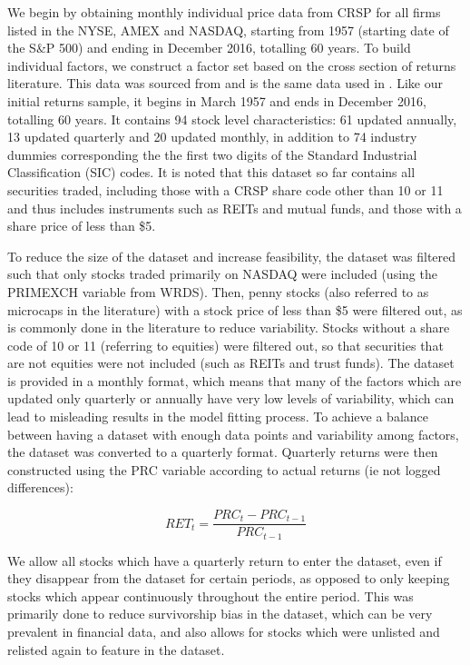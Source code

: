 \documentclass{article}
\begin{document}
We begin by obtaining monthly individual price data from CRSP for all firms listed in the NYSE, AMEX and NASDAQ, starting from 1957 (starting date of the S\&P 500) and ending in December 2016, totalling 60 years. To build individual factors, we construct a factor set based on the cross section of returns literature. This data was sourced from and is the same data used in \cite{gu_empirical_2018}. Like our initial returns sample, it begins in March 1957 and ends in December 2016, totalling 60 years. It contains 94 stock level characteristics: 61 updated annually, 13 updated quarterly and 20 updated monthly, in addition to 74 industry dummies corresponding the the first two digits of the Standard Industrial Classification (SIC) codes. It is noted that this dataset so far contains all securities traded, including those with a CRSP share code other than 10 or 11 and thus includes instruments such as REITs and mutual funds, and those with a share price of less than \$5.


To reduce the size of the dataset and increase feasibility, the dataset was filtered such that only stocks traded primarily on NASDAQ were included (using the PRIMEXCH variable from WRDS). Then, penny stocks (also referred to as microcaps in the literature) with a stock price of less than \$5 were filtered out, as is commonly done in the literature to reduce variability. Stocks without a share code of 10 or 11 (referring to equities) were filtered out, so that securities that are not equities were not included (such as REITs and trust funds). The dataset is provided in a monthly format, which means that many of the factors which are updated only quarterly or annually have very low levels of variability, which can lead to misleading results in the model fitting process. To achieve a balance between having a dataset with enough data points and variability among factors, the dataset was converted to a quarterly format. Quarterly returns were then constructed using the PRC variable according to actual returns (ie not logged differences):

\begin{equation}
RET_t = \frac{PRC_t - PRC_{t-1}}{PRC_{t-1}}
\end{equation}

We allow all stocks which have a quarterly return to enter the dataset, even if they disappear from the dataset for certain periods, as opposed to only keeping stocks which appear continuously throughout the entire period. This was primarily done to reduce survivorship bias in the dataset, which can be very prevalent in financial data, and also allows for stocks which were unlisted and relisted again to feature in the dataset. 
\end{document}
